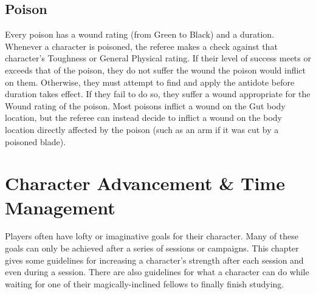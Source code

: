 \documentclass[oneside]{book}
\begin{document}
\begin{multicols}{2}
\section{Poison}
Every poison has a wound rating (from Green to Black) and a duration. Whenever a character is poisoned, the referee makes a check against that character's Toughness or General Physical rating. If their level of success meets or exceeds that of the poison, they do not suffer the wound the poison would inflict on them. Otherwise, they must attempt to find and apply the antidote before duration takes effect. If they fail to do so, they suffer a wound appropriate for the Wound rating of the poison. Most poisons inflict a wound on the Gut body location, but the referee can instead decide to inflict a wound on the body location directly affected by the poison (such as an arm if it was cut by a poisoned blade).

\end{multicols}

\chapter{Character Advancement \& Time Management}

Players often have lofty or imaginative goals for their character. Many of these goals can only be achieved after a series of sessions or campaigns. This chapter gives some guidelines for increasing a character's strength after each session and even during a session. There are also guidelines for what a character can do while waiting for one of their magically-inclined fellows to finally finish studying. \newline
\end{document}
